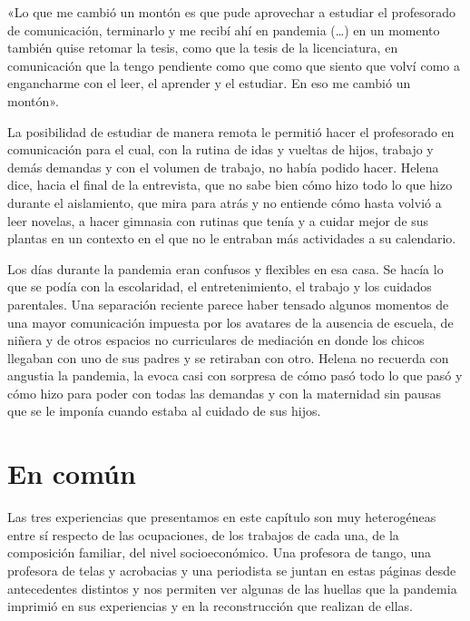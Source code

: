 \begin{refsection}
\begin{gbcita}
«Lo que me cambió un montón es que pude aprovechar a estudiar el profesorado de comunicación, terminarlo y me recibí ahí en pandemia (…) en un momento también quise retomar la tesis, como que la tesis de la licenciatura, en comunicación que la tengo pendiente como que como que siento que volví como a engancharme con el leer, el aprender y el estudiar. En eso me cambió un montón».

\end{gbcita}

La posibilidad de estudiar de manera remota le permitió hacer el profesorado en comunicación para el cual, con la rutina de idas y vueltas de hijos, trabajo y demás demandas y con el volumen de trabajo, no había podido hacer. Helena dice, hacia el final de la entrevista, que no sabe bien cómo hizo todo lo que hizo durante el aislamiento, que mira para atrás y no entiende cómo hasta volvió a leer novelas, a hacer gimnasia con rutinas que tenía y a cuidar mejor de sus plantas en un contexto en el que no le entraban más actividades a su calendario.

Los días durante la pandemia eran confusos y flexibles en esa casa. Se hacía lo que se podía con la escolaridad, el entretenimiento, el trabajo y los cuidados parentales. Una separación reciente parece haber tensado algunos momentos de una mayor comunicación impuesta por los avatares de la ausencia de escuela, de niñera y de otros espacios no curriculares de mediación en donde los chicos llegaban con uno de sus padres y se retiraban con otro. Helena no recuerda con angustia la pandemia, la evoca casi con sorpresa de cómo pasó todo lo que pasó y cómo hizo para poder con todas las demandas y con la maternidad sin pausas que se le imponía cuando estaba al cuidado de sus hijos.


\section[En común]{En común}
\label{cap-28.en-comun}
Las tres experiencias que presentamos en este capítulo son muy heterogéneas entre sí respecto de las ocupaciones, de los trabajos de cada una, de la composición familiar, del nivel socioeconómico. Una profesora de tango, una profesora de telas y acrobacias y una periodista se juntan en estas páginas desde antecedentes distintos y nos permiten ver algunas de las huellas que la pandemia imprimió en sus experiencias y en la reconstrucción que realizan de ellas.


\end{refsection}
